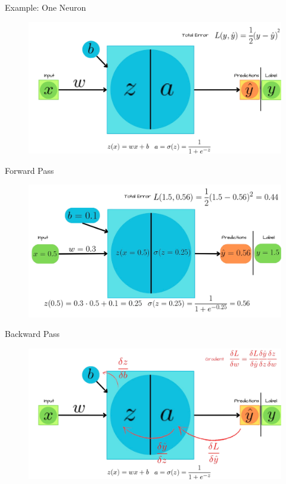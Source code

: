 \documentclass[serif, aspectratio=169]{beamer}
\begin{document}
\begin{frame}{Example: One Neuron}
    \begin{figure}
        \vspace{-0.3cm}
        \includegraphics[width=.9\linewidth, height=\textheight, keepaspectratio]{pic/1.png}
    \end{figure}
\end{frame}

\begin{frame}{Forward Pass}
    \begin{figure}
        \vspace{-0.3cm}
        \includegraphics[width=.9\linewidth, height=\textheight, keepaspectratio]{pic/2.png}
    \end{figure}
\end{frame}

\begin{frame}{Backward Pass}
    \begin{figure}
        \vspace{-0.3cm}
        \includegraphics[width=.9\linewidth, height=\textheight, keepaspectratio]{pic/4.png}
    \end{figure}
\end{frame}
\end{document}

